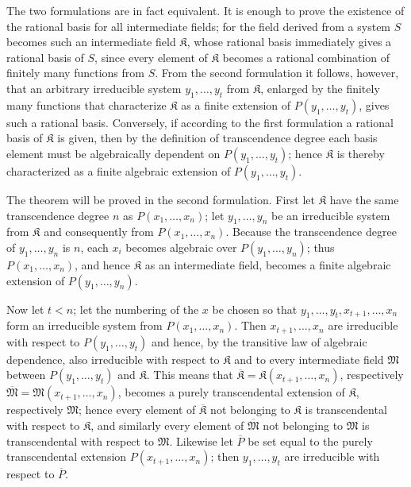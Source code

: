 \documentclass[11pt]{article}
\begin{document}
The two formulations are in fact equivalent. It is enough to prove the existence of the rational basis for all intermediate fields; for the field derived from a system $S$ becomes such an intermediate field $\mathfrak K$, whose rational basis immediately gives a rational basis of $S$, since every element of $\mathfrak K$ becomes a rational combination of finitely many functions from $S$. From the second formulation it follows, however, that an arbitrary irreducible system $y_1,\ldots,y_t$ from $\mathfrak K$, enlarged by the finitely many functions that characterize $\mathfrak K$ as a finite extension of $P(y_1,\ldots,y_t)$, gives such a rational basis. Conversely, if according to the first formulation a rational basis of $\mathfrak K$ is given, then by the definition of transcendence degree each basis element must be algebraically dependent on $P(y_1,\ldots,y_t)$; hence $\mathfrak K$ is thereby characterized as a finite algebraic extension of $P(y_1,\ldots,y_t)$.

The theorem will be proved in the second formulation. First let $\mathfrak K$ have the same transcendence degree $n$ as $P(x_1,\ldots,x_n)$; let $y_1,\ldots,y_n$ be an irreducible system from $\mathfrak K$ and consequently from $P(x_1,\ldots,x_n)$. Because the transcendence degree of $y_1,\ldots,y_n$ is $n$, each $x_i$ becomes algebraic over $P(y_1,\ldots,y_n)$; thus $P(x_1,\ldots,x_n)$, and hence $\mathfrak K$ as an intermediate field, becomes a finite algebraic extension of $P(y_1,\ldots,y_n)$.

Now let $t<n$; let the numbering of the $x$ be chosen so that $y_1,\ldots,y_t,x_{t+1},\ldots,x_n$ form an irreducible system from $P(x_1,\ldots,x_n)$. Then $x_{t+1},\ldots,x_n$ are irreducible with respect to $P(y_1,\ldots,y_t)$ and hence, by the transitive law of algebraic dependence, also irreducible with respect to $\mathfrak K$ and to every intermediate field $\mathfrak M$ between $P(y_1,\ldots,y_t)$ and $\mathfrak K$. This means that $\overline{\mathfrak K}=\mathfrak K(x_{t+1},\ldots,x_n)$, respectively $\overline{\mathfrak M}=\mathfrak M(x_{t+1},\ldots,x_n)$, becomes a purely transcendental extension of $\mathfrak K$, respectively $\mathfrak M$; hence every element of $\overline{\mathfrak K}$ not belonging to $\mathfrak K$ is transcendental with respect to $\mathfrak K$, and similarly every element of $\overline{\mathfrak M}$ not belonging to $\mathfrak M$ is transcendental with respect to $\mathfrak M$. Likewise let $\overline P$ be set equal to the purely transcendental extension $P(x_{t+1},\ldots,x_n)$; then $y_1,\ldots,y_t$ are irreducible with respect to $\overline P$.
\end{document}
